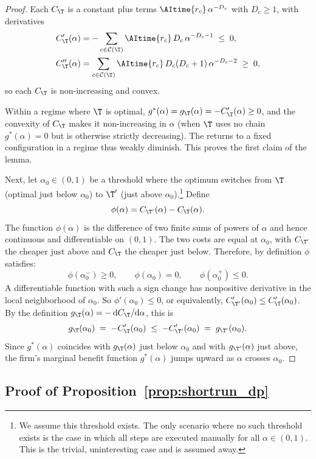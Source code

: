 \begin{proof}
Each $C_\T$ is a constant plus terms $\AItime{r_c}\,\alpha^{-D_c}$ with $D_c \ge 1$, with derivatives
\[
\begin{aligned}
C_\T'(\alpha) &= -\sum_{c \in \mathcal{C}(\T)} \AItime{r_c}\,D_c\,\alpha^{-D_c-1} \;\le\; 0, \\
C_\T''(\alpha) &= \sum_{c \in \mathcal{C}(\T)} \AItime{r_c}\,D_c(D_c+1)\,\alpha^{-D_c-2} \;\ge\; 0,
\end{aligned}
\]
so each $C_\T$ is non-increasing and convex.

Within a regime where $\T$ is optimal, $g^*(\alpha) = g_\T(\alpha) = -C_\T'(\alpha) \ge 0$, and the convexity of $C_\T$ makes it non-increasing in $\alpha$ (when $\T$ uses no chain $g^*(\alpha) = 0$ but is otherwise strictly decreasing).
The returns to a fixed configuration in a regime thus weakly diminish.
This proves the first claim of the lemma.

Next, let $\alpha_0 \in (0,1)$ be a threshold where the optimum switches from $\T$ (optimal just below $\alpha_0$) to $\T'$ (just above $\alpha_0$).\footnote{We assume this threshold exists. The only scenario where no such threshold exists is the case in which all steps are executed manually for all $\alpha \in (0,1)$. This is the trivial, uninteresting case and is assumed away.}
Define
\[
\phi(\alpha) = C_{\T'}(\alpha) - C_\T(\alpha).
\]
The function $\phi(\alpha)$ is the difference of two finite sums of powers of $\alpha$ and hence continuous and differentiable on $(0,1)$. 
The two costs are equal at $\alpha_0$, with $C_{\T'}$ the cheaper just above and $C_\T$ the cheaper just below.
Therefore, by definition $\phi$ satisfies:
\[
\phi(\alpha_0^{-}) \ge 0,
\qquad
\phi(\alpha_0) = 0,
\qquad
\phi(\alpha_0^{+}) \le 0.
\]
A differentiable function with such a sign change has nonpositive derivative in the local neighborhood of $\alpha_0$.
So $\phi'(\alpha_0) \le 0$, or equivalently, $C_{\T'}'(\alpha_0) \le C_\T'(\alpha_0)$.
By the definition $g_\T(\alpha) = -\,\mathrm{d}C_\T/\mathrm{d}\alpha$, this is
\[
g_\T(\alpha_0) \;=\; -C_\T'(\alpha_0)
\;\le\;
-C_{\T'}'(\alpha_0) \;=\; g_{\T'}(\alpha_0).
\]
Since $g^*(\alpha)$ coincides with $g_\T(\alpha)$ just below $\alpha_0$ and with $g_{\T'}(\alpha)$ just above, the firm's marginal benefit function $g^*(\alpha)$ jumps upward as $\alpha$ crosses $\alpha_0$.
\end{proof}

\subsection{Proof of Proposition~\ref{prop:shortrun_dp}}
\label{app:shortrun_proof}

